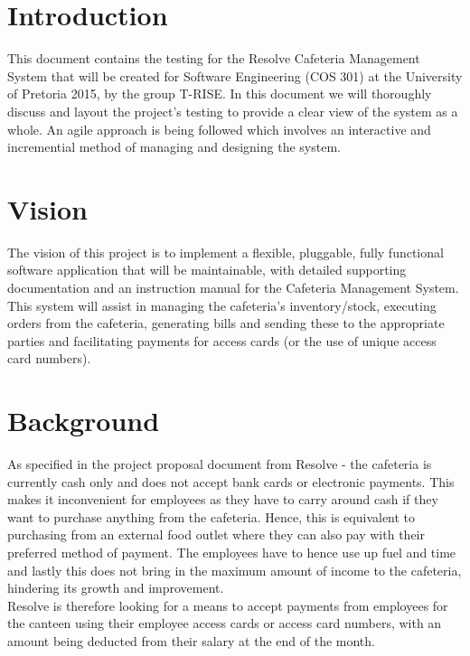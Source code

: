 \documentclass[a4paper,12pt]{article}
\begin{document}
\section{Introduction}
This document contains the   testing for the Resolve Cafeteria Management System that will be created for Software Engineering (COS 301) at the University of Pretoria 2015, by the group T-RISE. In this document we will thoroughly discuss and layout the project's testing to provide a clear view of the system as a whole. An agile approach is being followed which involves an interactive and incremential method of managing and designing the system. 

\section{Vision}
The vision of this project is to implement a flexible, pluggable, fully functional software application that will be maintainable, with detailed supporting documentation and an instruction manual for the Cafeteria Management System. This system will assist in managing the cafeteria's inventory/stock, executing orders from the cafeteria, generating bills and sending these to the appropriate parties and facilitating payments for access cards (or the use of unique access card numbers). 

\section{Background}
As specified in the project proposal document from Resolve - the cafeteria is currently cash only and does not accept bank cards or electronic payments. This makes it inconvenient for employees as they have to carry around cash if they want to purchase anything from the cafeteria. Hence, this is equivalent to purchasing from an external food outlet where they can also pay with their preferred method of payment. The employees have to hence use up fuel and time and lastly this does not bring in the maximum amount of income to the cafeteria, hindering its growth and improvement.\\

Resolve is therefore looking for a means to accept payments from employees for the canteen using their employee access cards or access card numbers, with an amount being deducted from their salary at the end of the month.\\
\end{document}
